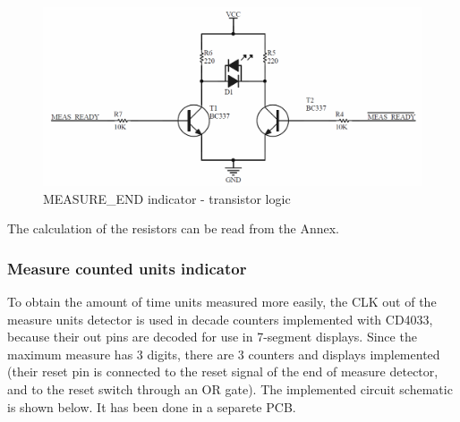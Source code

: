 \begin{figure}[H]
    \begin{centering}
    \includegraphics[width=1\textwidth]{Transistor_LogicLED}
    \par\end{centering}
    \caption{MEASURE\_END indicator - transistor logic}
\end{figure}
The calculation of the resistors can be read from the Annex.

\subsubsection*{Measure counted units indicator}

To obtain the amount of time units measured more easily, the CLK out of the
measure units detector is used in decade counters implemented with CD4033, because 
their out pins are decoded for use in 7-segment displays. Since the maximum measure 
has 3 digits, there are 3 counters and displays implemented (their reset pin is 
connected to the reset signal of the end of measure detector, and to the reset switch 
through an OR gate). The implemented circuit schematic is shown below. It has been done in 
a separete PCB.

